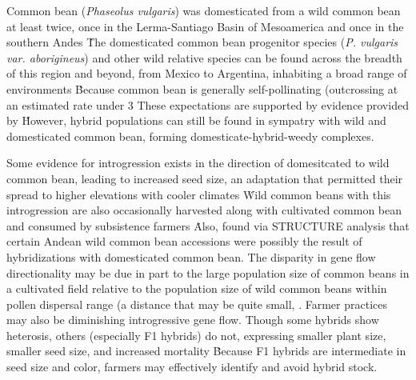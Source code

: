 \documentclass[11pt]{article}
\begin{document}
Common bean (\emph{Phaseolus vulgaris}) was domesticated from a wild common bean at least twice, once in the Lerma-Santiago Basin of Mesoamerica and once in the southern Andes \cite{kwak2009putative}\.
The domesticated common bean progenitor species (\emph{P. vulgaris var. aborigineus}) and other wild relative species can be found across the breadth of this region and beyond, from Mexico to Argentina, inhabiting a broad range of environments \cite{debouck1988implications, CWR}\.
Because common bean is generally self-pollinating (outcrossing at an estimated rate under 3%
These expectations are supported by evidence provided by \cite{papa2003asymmetry}\.
However, hybrid populations can still be found in sympatry with wild and domesticated common bean, forming domesticate-hybrid-weedy complexes.

Some evidence for introgression exists in the direction of domesitcated to wild common bean, leading to increased seed size, an adaptation that permitted their spread to higher elevations with cooler climates \cite{debouck1993genetic}\.
Wild common beans with this introgression are also occasionally harvested along with cultivated common bean and consumed by subsistence farmers \cite{papa2003asymmetry}\.
Also, \cite{kwak2009structure} found via STRUCTURE analysis that certain Andean wild common bean accessions were possibly the result of hybridizations with domesticated common bean.
The disparity in gene flow directionality may be due in part to the large population size of common beans in a cultivated field relative to the population size of wild common beans within pollen dispersal range (a distance that may be quite small, \cite{papa2003asymmetry}.
Farmer practices may also be diminishing introgressive gene flow.
Though some hybrids show heterosis, others (especially F1 hybrids) do not, expressing smaller plant size, smaller seed size, and increased mortality \cite{gutierrez1985heterosis, paredes1995extensive}\.
Because F1 hybrids are intermediate in seed size and color, farmers may effectively identify and avoid hybrid stock.
\end{document}
